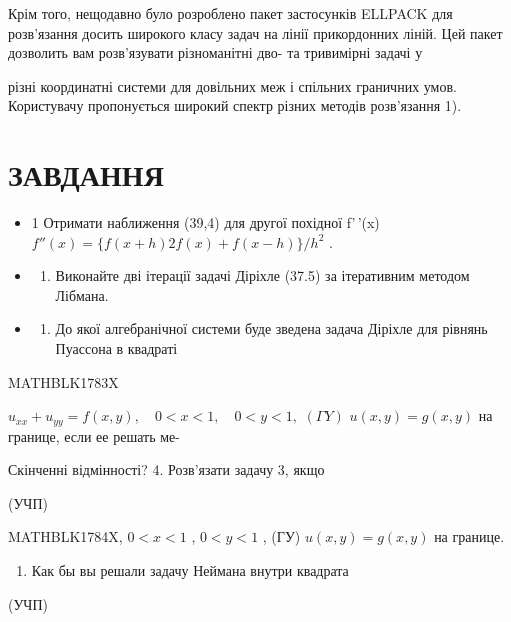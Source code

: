 \documentclass[
  ukrainian,
]{article}
\providecommand{\tightlist}{%
  \setlength{\itemsep}{0pt}\setlength{\parskip}{0pt}}
\begin{document}
Крім того, нещодавно було розроблено пакет застосунків ELLPACK для
розв'язання досить широкого класу задач на лінії прикордонних ліній. Цей
пакет дозволить вам розв'язувати різноманітні дво- та тривимірні задачі
у

різні координатні системи для довільних меж і спільних граничних умов.
Користувачу пропонується широкий спектр різних методів розв'язання 1).

\section{ЗАВДАННЯ}\label{ux437ux430ux432ux434ux430ux43dux43dux44f-1}

\begin{itemize}
\tightlist
\item
  1 Отримати наближення (39,4) для другої похідної f'\,'(x)
  \(f''(x) = \{f(x+h) 2f(x) + f(x-h)\}/h^2\) .
\item
  \begin{enumerate}
  \def\labelenumi{\arabic{enumi}.}
  \setcounter{enumi}{1}
  \tightlist
  \item
    Виконайте дві ітерації задачі Діріхле (37.5) за ітеративним методом
    Лібмана.
  \end{enumerate}
\item
  \begin{enumerate}
  \def\labelenumi{\arabic{enumi}.}
  \setcounter{enumi}{2}
  \tightlist
  \item
    До якої алгебранічної системи буде зведена задача Діріхле для
    рівнянь Пуассона в квадраті
  \end{enumerate}
\end{itemize}

MATHBLK1783X

\(u_{xx} + u_{yy} = f(x,y), \quad 0 < x < 1, \quad 0 < y < 1,\)
\((\Gamma Y)\) \(u(x,y) = g(x,y)\) на границе, если ее решать ме-

Скінченні відмінності? 4. Розв'язати задачу 3, якщо

(УЧП)

MATHBLK1784X, \(0 < x < 1\) , \(0 < y < 1\) , (ГУ) \(u(x, y) = g(x, y)\)
на границе.

\begin{enumerate}
\def\labelenumi{\arabic{enumi}.}
\setcounter{enumi}{4}
\tightlist
\item
  Как бы вы решали задачу Неймана внутри квадрата
\end{enumerate}

(УЧП)
\end{document}
